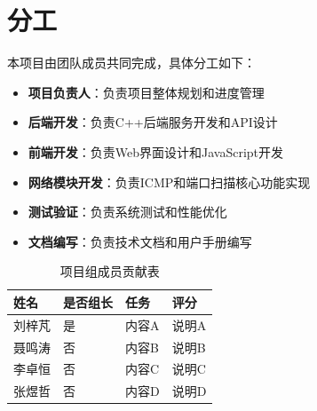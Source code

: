 \documentclass[12pt,hyperref,a4paper,UTF8]{ctexart}
\begin{document}
\section{分工}

本项目由团队成员共同完成，具体分工如下：

\begin{itemize}
    \item \textbf{项目负责人}：负责项目整体规划和进度管理
    \item \textbf{后端开发}：负责C++后端服务开发和API设计
    \item \textbf{前端开发}：负责Web界面设计和JavaScript开发
    \item \textbf{网络模块开发}：负责ICMP和端口扫描核心功能实现
    \item \textbf{测试验证}：负责系统测试和性能优化
    \item \textbf{文档编写}：负责技术文档和用户手册编写
\end{itemize}


\begin{table}[H]
\centering
\renewcommand{\arraystretch}{1.3} %
\setlength{\tabcolsep}{18pt}      %
\begin{tabular}{|p{3cm}|p{2cm}|p{5cm}|p{3cm}|}
\hline
姓名 & 是否组长 & 任务 & 评分 \\
\hline
刘梓芃 & 是 & 内容A & 说明A \\
\hline
聂鸣涛 & 否 & 内容B & 说明B \\
\hline
李卓恒 & 否 & 内容C & 说明C \\
\hline
张煜哲 & 否 & 内容D & 说明D \\
\hline
\end{tabular}
\caption{项目组成员贡献表}
\end{table}

\end{document}
